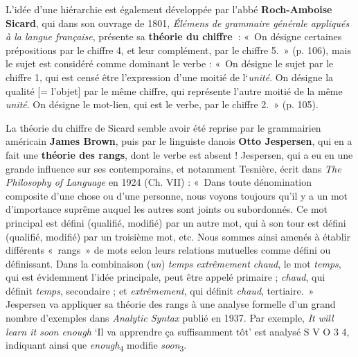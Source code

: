 {    L’idée d’une hiérarchie est également développée par l’abbé \textbf{Roch-Amboise} \textbf{Sicard}, qui dans son ouvrage de 1801, \textit{Élémens de grammaire générale appliqués à la langue française}, présente sa \textbf{théorie du chiffre~}: «~On désigne certaines prépositions par le chiffre 4, et leur complément, par le chiffre 5.~» (p. 106), mais le sujet est considéré comme dominant le verbe : «~On désigne le sujet par le chiffre 1, qui est censé être l’expression d’une moitié de l‘\textit{unité}. On désigne la qualité [= l’objet] par le même chiffre, qui représente l’autre moitié de la même \textit{unité}. On désigne le mot-lien, qui est le verbe, par le chiffre 2.~» (p. 105).

    La théorie du chiffre de Sicard semble avoir été reprise par le grammairien américain \textbf{James Brown}, puis par le linguiste danois \textbf{Otto Jespersen}, qui en a fait une \textbf{théorie des rangs}, dont le verbe est absent ! Jespersen, qui a eu en une grande influence sur ses contemporains, et notamment Tesnière, écrit dans \textit{The Philosophy of Language} en 1924 (Ch. VII) : «~Dans toute dénomination composite d’une chose ou d’une personne, nous voyons toujours qu’il y a un mot d’importance suprême auquel les autres sont joints ou subordonnés. Ce mot principal est défini (qualifié, modifié) par un autre mot, qui à son tour est défini (qualifié, modifié) par un troisième mot, etc. Nous sommes ainsi amenés à établir différents «~rangs~» de mots selon leurs relations mutuelles comme défini ou définissant. Dans la combinaison (\textit{un}) \textit{temps extrêmement chaud}, le mot \textit{temps}, qui est évidemment l’idée principale, peut être appelé primaire ; \textit{chaud}, qui définit \textit{temps}, secondaire ; et \textit{extrêmement}, qui définit \textit{chaud}, tertiaire.~» Jespersen va appliquer sa théorie des rangs à une analyse formelle d’un grand nombre d’exemples dans \textit{Analytic Syntax} publié en 1937. Par exemple, \textit{It will learn it soon enough} ‘Il va apprendre ça suffisamment tôt’ est analysé S V O 3 4, indiquant ainsi que \textit{enough}\textsubscript{4} modifie \textit{soon}\textsubscript{3}.

}
